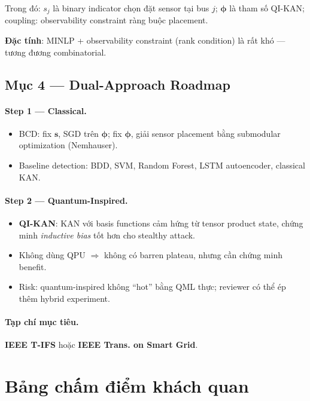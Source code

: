 \documentclass[11pt,a4paper]{article}
\begin{document}
Trong đó: $s_j$ là binary indicator chọn đặt sensor tại bus $j$; $\boldsymbol{\phi}$ là tham số QI-KAN; coupling: observability constraint ràng buộc placement.

\textbf{Đặc tính}: MINLP + observability constraint (rank condition) là rất khó --- tương đương combinatorial.

\subsection{Mục 4 --- Dual-Approach Roadmap}

\paragraph{Step 1 --- Classical.}
\begin{itemize}
  \item BCD: fix $\mathbf{s}$, SGD trên $\boldsymbol{\phi}$; fix $\boldsymbol{\phi}$, giải sensor placement bằng submodular optimization (Nemhauser).
  \item Baseline detection: BDD, SVM, Random Forest, LSTM autoencoder, classical KAN.
\end{itemize}

\paragraph{Step 2 --- Quantum-Inspired.}
\begin{itemize}
  \item \textbf{QI-KAN}: KAN với basis functions cảm hứng từ tensor product state, chứng minh \textit{inductive bias} tốt hơn cho stealthy attack.
  \item Không dùng QPU $\Rightarrow$ không có barren plateau, nhưng cần chứng minh benefit.
  \item Risk: quantum-inspired không ``hot'' bằng QML thực; reviewer có thể ép thêm hybrid experiment.
\end{itemize}

\paragraph{Tạp chí mục tiêu.}
\textbf{IEEE T-IFS} hoặc \textbf{IEEE Trans. on Smart Grid}.

\section{Bảng chấm điểm khách quan}
\end{document}
